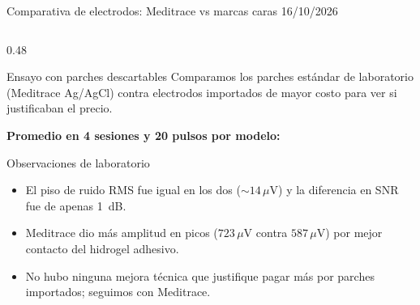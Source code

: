 \documentclass[aspectratio=169,10pt]{beamer}
\begin{document}
\begin{frame}{Comparativa de electrodos: Meditrace vs marcas caras \hfill \textnormal{\footnotesize 16/10/2026}}
    \begin{columns}[c]
        \begin{column}{0.48\textwidth}
            \footnotesize
            \begin{block}{Ensayo con parches descartables}
                Comparamos los parches estándar de laboratorio (Meditrace Ag/AgCl) contra electrodos importados de mayor costo para ver si justificaban el precio.
            \end{block}
            \vspace{0.06cm}
            \textbf{\scriptsize Promedio en 4 sesiones y 20 pulsos por modelo:}
            \vspace{0.02cm}
            \centering
            \vspace{0.08cm}
            \begin{block}{Observaciones de laboratorio}
                \begin{itemize}
                    \item El piso de ruido RMS fue igual en los dos ($\sim 14\,\mu\text{V}$) y la diferencia en SNR fue de apenas 1~dB.
                    \item Meditrace dio más amplitud en picos ($723\,\mu\text{V}$ contra $587\,\mu\text{V}$) por mejor contacto del hidrogel adhesivo.
                    \item No hubo ninguna mejora técnica que justifique pagar más por parches importados; seguimos con Meditrace.

\end{itemize}
\end{block}
\end{column}
\end{columns}
\end{frame}
\end{document}
